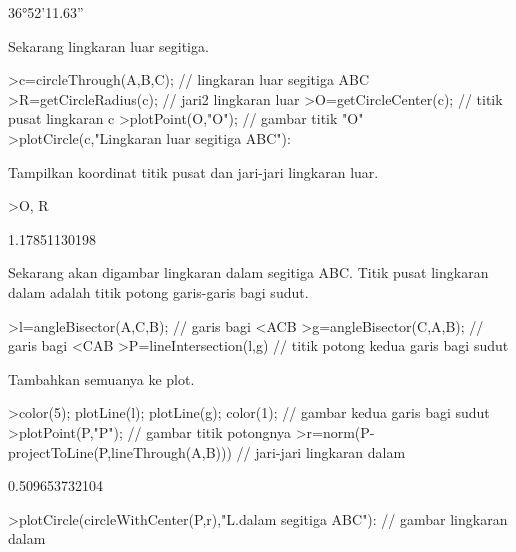 \documentclass{article}
\begin{document}
\begin{eulernotebook}
\begin{euleroutput}
  36°52'11.63''
\end{euleroutput}
\begin{eulercomment}
Sekarang lingkaran luar segitiga.
\end{eulercomment}
\begin{eulerprompt}
>c=circleThrough(A,B,C); // lingkaran luar segitiga ABC
>R=getCircleRadius(c); // jari2 lingkaran luar 
>O=getCircleCenter(c); // titik pusat lingkaran c 
>plotPoint(O,"O"); // gambar titik "O"
>plotCircle(c,"Lingkaran luar segitiga ABC"):
\end{eulerprompt}
\begin{eulercomment}
Tampilkan koordinat titik pusat dan jari-jari lingkaran luar.
\end{eulercomment}
\begin{eulerprompt}
>O, R
\end{eulerprompt}
\begin{euleroutput}
  [1.16667,  1.16667]
  1.17851130198
\end{euleroutput}
\begin{eulercomment}
Sekarang akan digambar lingkaran dalam segitiga ABC. Titik pusat lingkaran dalam adalah
titik potong garis-garis bagi sudut.
\end{eulercomment}
\begin{eulerprompt}
>l=angleBisector(A,C,B); // garis bagi <ACB
>g=angleBisector(C,A,B); // garis bagi <CAB
>P=lineIntersection(l,g) // titik potong kedua garis bagi sudut
\end{eulerprompt}
\begin{euleroutput}
  [0.86038,  0.86038]
\end{euleroutput}
\begin{eulercomment}
Tambahkan semuanya ke plot.
\end{eulercomment}
\begin{eulerprompt}
>color(5); plotLine(l); plotLine(g); color(1); // gambar kedua garis bagi sudut
>plotPoint(P,"P"); // gambar titik potongnya
>r=norm(P-projectToLine(P,lineThrough(A,B))) // jari-jari lingkaran dalam
\end{eulerprompt}
\begin{euleroutput}
  0.509653732104
\end{euleroutput}
\begin{eulerprompt}
>plotCircle(circleWithCenter(P,r),"L.dalam segitiga ABC"): // gambar lingkaran dalam
\end{eulerprompt}

\end{eulernotebook}
\end{document}
